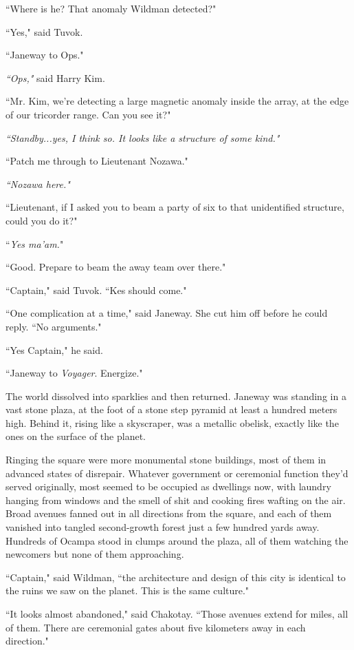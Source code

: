 \documentclass[twoside,letterpaper,12pt]{memoir}
\begin{document}
``Where is he? That anomaly Wildman detected?" 

``Yes," said Tuvok. 

``Janeway to Ops."

\textit{``Ops," }said Harry Kim. 

``Mr. Kim, we're detecting a large magnetic anomaly inside the array, at the edge of our tricorder range. Can you see it?" 

\textit{``Standby...yes, I think so. It looks like a structure of some kind."} 

``Patch me through to Lieutenant Nozawa." 

\textit{``Nozawa here."} 

``Lieutenant, if I asked you to beam a party of six to that unidentified structure, could you do it?" 

``\textit{Yes ma'am.}" 

``Good. Prepare to beam the away team over there." 

``Captain," said Tuvok. ``Kes should come." 

``One complication at a time," said Janeway. She cut him off before he could reply. ``No arguments." 

``Yes Captain," he said. 

``Janeway to \textit{Voyager}. Energize." 

The world dissolved into sparklies and then returned. Janeway was standing in a vast stone plaza, at the foot of a stone step pyramid at least a hundred meters high. Behind it, rising like a skyscraper, was a metallic obelisk, exactly like the ones on the surface of the planet. 

Ringing the square were more monumental stone buildings, most of them in advanced states of disrepair. Whatever government or ceremonial function they'd served originally, most seemed to be occupied as dwellings now, with laundry hanging from windows and the smell of shit and cooking fires wafting on the air. Broad avenues fanned out in all directions from the square, and each of them vanished into tangled second-growth forest just a few hundred yards away. Hundreds of Ocampa stood in clumps around the plaza, all of them watching the newcomers but none of them approaching. 

``Captain," said Wildman, ``the architecture and design of this city is identical to the ruins we saw on the planet. This is the same culture." 

``It looks almost abandoned," said Chakotay. ``Those avenues extend for miles, all of them. There are ceremonial gates about five kilometers away in each direction." 
\end{document}
